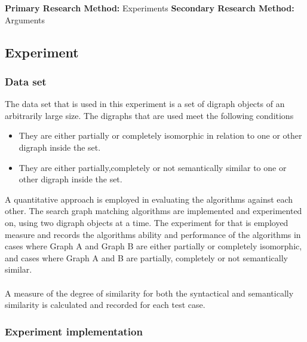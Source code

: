 \label{Methodology}
\textbf{Primary Research Method:} Experiments
\textbf{Secondary Research Method:} Arguments



\subsection{Experiment}
\subsubsection{Data set}
The data set that is used in this experiment is a set of digraph objects of an arbitrarily large size. The digraphs that are used meet the following conditions
\begin{itemize}
  \item They are either partially or completely isomorphic in relation to one or other digraph inside the set.
  \item They are either partially,completely or not semantically similar to one or other digraph inside the set.
\end{itemize}

A quantitative approach is employed in evaluating the algorithms against each other. The search graph matching algorithms are implemented and experimented on, using two digraph objects at a time. The experiment for that is employed measure and records the algorithms ability and performance of the algorithms in cases where Graph A and Graph B are either partially or completely isomorphic, and cases where Graph A and B are partially, completely or not semantically similar.\\\\
A measure of the degree of similarity for both the syntactical and semantically similarity is calculated and recorded for each test case.

\subsubsection{Experiment implementation}


